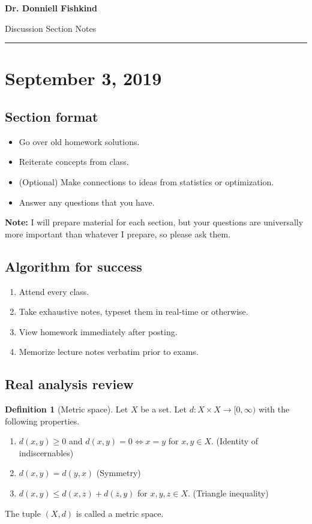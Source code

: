 \documentclass[11pt]{article}
\newcommand{\ra}{\rightarrow}
\theoremstyle{plain}
\theoremstyle{definition}
\newtheorem{defi}{Definition}[section]
\theoremstyle{remark}
\begin{document}

 \hfill {\bf Dr. Donniell Fishkind}

 \hfill 
{Discussion Section Notes}

\noindent \rule[0.1in]{\textwidth}{0.4pt}


\section{September 3, 2019}

\subsection{Section format}
\begin{itemize}
    \item Go over old homework solutions.
    \item Reiterate concepts from class.
    \item (Optional) Make connections to ideas from statistics or optimization.
    \item Answer any questions that you have.
\end{itemize}
{\bf Note:} I will prepare material for each section, but your questions are universally more important than whatever I prepare, so please ask them.
\subsection{Algorithm for success}
\begin{enumerate}
    \item Attend every class.
    \item Take exhaustive notes, typeset them in real-time or otherwise.
    \item View homework immediately after posting.
    \item Memorize lecture notes verbatim prior to exams.
\end{enumerate}

\subsection{Real analysis review}

\begin{defi}[Metric space]
    Let $X$ be a set. Let $d: X \times X \ra [0, \infty)$ with the following properties.
    \begin{enumerate}
        \item $d(x,y) \geq 0$ and $d(x,y) = 0 \iff x = y$ for $x, y \in X$. (Identity of indiscernables)
        \item $d(x,y) = d(y, x)$ (Symmetry)
        \item $d(x,y) \leq d(x,z) + d(z,y)$ for $x, y, z \in X$. (Triangle inequality)
    \end{enumerate}
    The tuple $(X, d)$ is called a metric space.
\end{defi}
\end{document}
